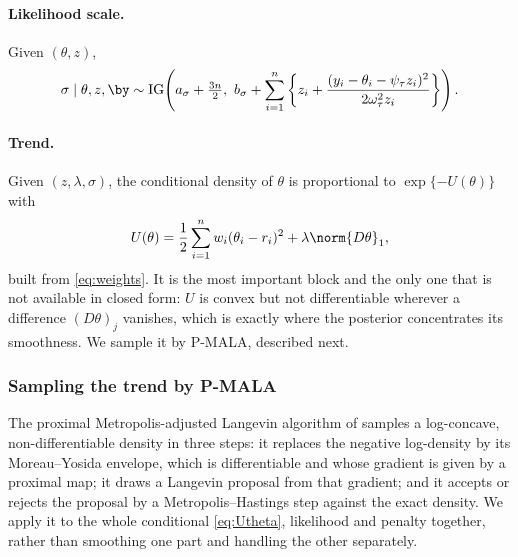 \paragraph{Likelihood scale.} Given $(\theta, z)$,
\begin{equation}
    \sigma \mid \theta, z, \by \sim \mathrm{IG}\!\left(a_\sigma + \tfrac{3n}{2},\ b_\sigma + \sum_{i=1}^n \left\{ z_i + \frac{(y_i - \theta_i - \psi_\tau z_i)^2}{2\omega_\tau^2 z_i}\right\}\right).
    \label{eq:sigmaupdate}
\end{equation}

\paragraph{Trend.} Given $(z, \lambda, \sigma)$, the conditional density of $\theta$ is proportional to $\exp\{-U(\theta)\}$ with
\begin{equation}
    U(\theta) = \frac{1}{2}\sum_{i=1}^n w_i (\theta_i - r_i)^2 + \lambda \norm{D\theta}_1,
    \label{eq:Utheta}
\end{equation}
built from \eqref{eq:weights}. It is the most important block and the only one that is not available in closed form: $U$ is convex but not differentiable wherever a difference $(D\theta)_j$ vanishes, which is exactly where the posterior concentrates its smoothness. We sample it by P-MALA, described next.

\subsubsection{Sampling the trend by P-MALA}
\label{subsec:pmala}

The proximal Metropolis-adjusted Langevin algorithm of \citet{pereyra2016proximal} samples a log-concave, non-differentiable density in three steps: it replaces the negative log-density by its Moreau--Yosida envelope, which is differentiable and whose gradient is given by a proximal map; it draws a Langevin proposal from that gradient; and it accepts or rejects the proposal by a Metropolis--Hastings step against the exact density. We apply it to the whole conditional \eqref{eq:Utheta}, likelihood and penalty together, rather than smoothing one part and handling the other separately.

